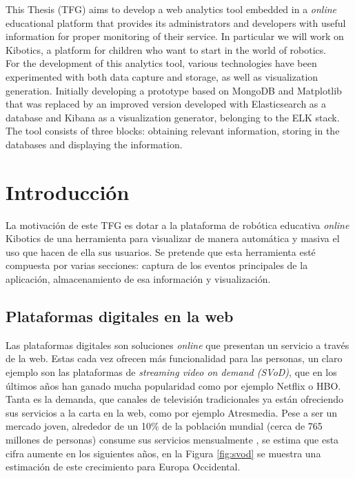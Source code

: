 \documentclass[a4paper, 12pt]{book}
\begin{document}
		This Thesis (TFG) aims to develop a web analytics tool embedded in a \textit{online} educational platform that provides its administrators and developers with useful information for proper monitoring of their service. In particular we will work on Kibotics, a platform for children who want to start in the world of robotics. \\
		
		For the development of this analytics tool, various technologies have been experimented with both data capture and storage, as well as visualization generation. Initially developing a prototype based on MongoDB and Matplotlib that was replaced by an improved version developed with Elasticsearch as a database and Kibana as a visualization generator, belonging to the ELK stack. The tool consists of three blocks: obtaining relevant information, storing in the databases and displaying the information.\\

	\tableofcontents 

	\cleardoublepage
	
	\listoffigures 
		
	\cleardoublepage
	\chapter{Introducción}
	\label{chap:introduccion} 
	
		La motivación de este TFG es dotar a la plataforma de robótica educativa \textit{online} Kibotics de una herramienta para visualizar de manera automática y masiva el uso que hacen de ella sus usuarios. Se pretende que esta herramienta esté compuesta por varias secciones: captura de los eventos principales de la aplicación, almacenamiento de esa información y visualización.
		
	\section{Plataformas digitales en la web}
	\label{sec:plataformas_digitales_web}
		Las plataformas digitales son soluciones \textit{online} que presentan un servicio a través de la web. Estas cada vez ofrecen más funcionalidad para las personas, un claro ejemplo son las plataformas de \textit{streaming video on demand (SVoD)}, que en los últimos años han ganado mucha popularidad como por ejemplo Netflix o HBO. Tanta es la demanda, que canales de televisión tradicionales ya están ofreciendo sus servicios a la carta en la web, como por ejemplo Atresmedia. Pese a ser un mercado joven, alrededor de un 10\% de la población mundial (cerca de 765 millones de personas) consume sus servicios mensualmente \cite{SVod}, se estima que esta cifra aumente en los siguientes años, en la Figura \ref{fig:svod} se muestra una estimación de este crecimiento para Europa Occidental.\\
		
\end{document}
